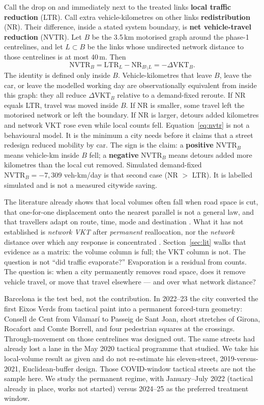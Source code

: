 \documentclass[a4paper,fleqn]{cas-dc}
\newcommand{\LTR}{\mathrm{LTR}}
\newcommand{\NR}{\mathrm{NR}}
\newcommand{\NVTR}{\mathrm{NVTR}}
\newcommand{\DVKT}{\Delta\mathrm{VKT}}
\begin{document}
Call the drop on and immediately next to the treated links \textbf{local
traffic reduction} (LTR). Call extra vehicle-kilometres on other links
\textbf{redistribution} (NR). Their difference, inside a stated system
boundary, is \textbf{net vehicle-travel reduction} (NVTR). Let $B$ be the
3.5\,km motorised graph around the phase-1 centrelines, and let
$L \subset B$ be the links whose undirected network distance to those
centrelines is at most 40\,m. Then
\begin{equation}
\NVTR_{B} = \LTR_{L} - \NR_{B\setminus L} = -\DVKT_{B}.
\label{eq:nvtr}
\end{equation}
The identity is defined only inside $B$. Vehicle-kilometres that leave $B$,
leave the car, or leave the modelled working day are observationally
equivalent from inside this graph: they all reduce $\DVKT_{B}$ relative to a
demand-fixed reroute. If NR equals LTR, travel was moved inside $B$. If NR is
smaller, some travel left the motorised network or left the boundary. If NR is
larger, detours added kilometres and network VKT rose even while local counts
fell. Equation~\eqref{eq:nvtr} is not a behavioural model. It is the minimum a
city needs before it claims that a street redesign reduced mobility by car.
The sign is the claim: a \textbf{positive} $\NVTR_{B}$ means vehicle-km inside
$B$ fell; a \textbf{negative} $\NVTR_{B}$ means detours added more kilometres
than the local cut removed. Simulated demand-fixed $\NVTR_{B}=-7{,}309$
veh-km/day is that second case (NR $>$ LTR). It is labelled simulated and is
not a measured citywide saving.

The literature already shows that local volumes often fall when road space is
cut, that one-for-one displacement onto the nearest parallel is not a general
law, and that travellers adapt on route, time, mode and destination
\citep{Cairns1998,Cairns2002,Chung2012,NelloDeakin2022,Thomas2024,Tennoy2021,Parady2025}.
What it has not established is \emph{network VKT} after \emph{permanent}
reallocation, nor the \emph{network} distance over which any response is
concentrated \citep{Koorey2025}. Section~\ref{sec:lit} walks that evidence as
a matrix: the volume column is full; the VKT column is not. The question is
not ``did traffic evaporate?'' Evaporation is a residual from counts. The
question is: when a city permanently removes road space, does it remove
vehicle travel, or move that travel elsewhere --- and over what network
distance?

Barcelona is the test bed, not the contribution. In 2022--23 the city
converted the first Eixos Verds from tactical paint into a permanent
forced-turn geometry: Consell de Cent from Vilamar\'i to Passeig de Sant Joan,
short stretches of Girona, Rocafort and Comte Borrell, and four pedestrian
squares at the crossings. Through-movement on those centrelines was designed
out. The same streets had already lost a lane in the May 2020 tactical
programme that \citet{NelloDeakin2022} studied. We take his local-volume
result as given and do not re-estimate his eleven-street, 2019-versus-2021,
Euclidean-buffer design. Those COVID-window tactical streets are not the
sample here. We study the permanent regime, with January--July 2022 (tactical
already in place, works not started) versus 2024--25 as the preferred
treatment window.
\end{document}
